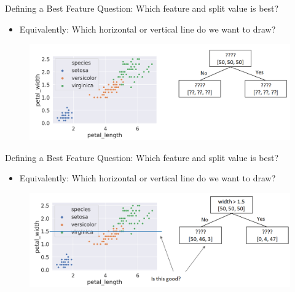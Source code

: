 \documentclass[aspectratio=169]{../latex_main/tntbeamer}  %
\begin{document}
	
	\begin{frame}{Defining a Best Feature}
	    Question: Which feature and split value is best?
	    \begin{itemize}
	        \item  Equivalently: Which horizontal or vertical line do we want to draw?
	    \end{itemize}
	    \begin{figure}
	        \centering
	        \includegraphics[scale=.4]{Bild41}
	    \end{figure}
	\end{frame}
	
	\begin{frame}{Defining a Best Feature}
	    Question: Which feature and split value is best?
	    \begin{itemize}
	        \item  Equivalently: Which horizontal or vertical line do we want to draw?
	    \end{itemize}
	    \begin{figure}
	        \centering
	        \includegraphics[scale=.4]{Bild42}
	    \end{figure}
	\end{frame}
	
\end{document}
